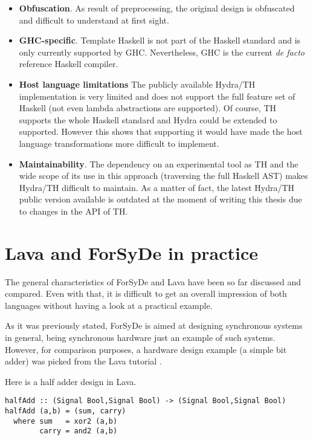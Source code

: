   \begin{itemize}
    
  \item \textbf{Obfuscation}. As result of preprocessing, the original
    design is obfuscated and difficult to understand at first sight.
    
  \item \textbf{GHC-specific}. Template Haskell is not part of the
    Haskell standard \cite{haskell} and is only currently supported by
    GHC. Nevertheless, GHC is the
    current \textit{de facto} reference Haskell compiler.
    
  \item \textbf{Host language limitations} The publicly available
    Hydra/TH implementation is very limited and does not support the
    full feature set of Haskell (not even lambda abstractions are
    supported).  Of course, TH supports the whole Haskell standard and
    Hydra could be extended to supported. However this shows that
    supporting it would have made the host language transformations
    more difficult to implement.

  \item \textbf{Maintainability}. The dependency on an experimental
    tool as TH and the wide scope of its use in this approach
    (traversing the full Haskell AST) makes Hydra/TH difficult to
    maintain. As a matter of fact, the latest Hydra/TH public version
    available is outdated at the moment of writing this thesis due to
    changes in the API of TH.
  \end{itemize}
  
  \section{Lava and ForSyDe in practice}
  The general characteristics of ForSyDe and Lava have been so far
  discussed and compared. Even with that, it is difficult to get an
  overall impression of both languages without having a look at a
  practical example.
  
  As it was previously stated, ForSyDe is aimed at designing synchronous
  systems in general, being synchronous hardware just an example of such
  systems.  However, for comparison purposes, a hardware design example
  (a simple bit adder) was picked from the Lava tutorial \cite{lava:tutorial}.
  
  Here is a half adder design in Lava.
  
\begin{lstlisting}
halfAdd :: (Signal Bool,Signal Bool) -> (Signal Bool,Signal Bool)
halfAdd (a,b) = (sum, carry)
  where sum   = xor2 (a,b)
        carry = and2 (a,b)
\end{lstlisting}

